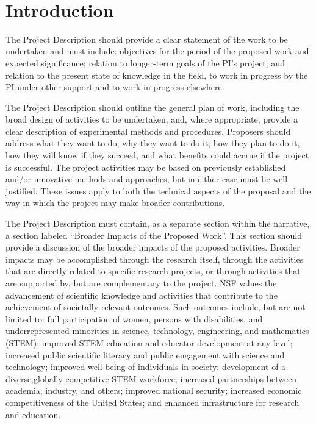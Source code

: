 \documentclass{DOEproposal}
\renewcommand{\title}{\noindent {\Large{\bf Here Goes Your Title!}}}
\begin{document}
\renewcommand{\thepage} {D--\arabic{page}}

\newpage

\title\\

\section{Introduction}

The Project Description should provide a clear statement of the work to be undertaken and must include:
objectives for the period of the proposed work and expected significance; relation to longer-term goals of the PI's
project; and relation to the present state of knowledge in the field, to work in progress by the PI under other
support and to work in progress elsewhere.

The Project Description should outline the general plan of work, including the broad design of activities to be
undertaken, and, where appropriate, provide a clear description of experimental methods and procedures.
Proposers should address what they want to do, why they want to do it, how they plan to do it, how they will
know if they succeed, and what benefits could accrue if the project is successful. The project activities may be
based on previously established and/or innovative methods and approaches, but in either case must be well
justified. These issues apply to both the technical aspects of the proposal and the way in which the project may
make broader contributions.

The Project Description must contain, as a separate section within the narrative, a section labeled ``Broader
Impacts of the Proposed Work''. This section should provide a discussion of the broader impacts of the proposed
activities. Broader impacts may be accomplished through the research itself, through the activities that are
directly related to specific research projects, or through activities that are supported by, but are complementary to 
the project. NSF values the advancement of scientific knowledge and activities that contribute to the
achievement of societally relevant outcomes. Such outcomes include, but are not limited to: full
participation of women, persons with disabilities, and underrepresented minorities in science, technology, engineering, and
mathematics (STEM); improved STEM education and educator development at any level; increased public
scientific literacy and public engagement with science and technology; improved well-being of individuals in
society; development of a diverse,globally competitive STEM workforce; increased partnerships between
academia, industry, and others; improved national security; increased economic competitiveness of the United
States; and enhanced infrastructure for research and education.
\end{document}
